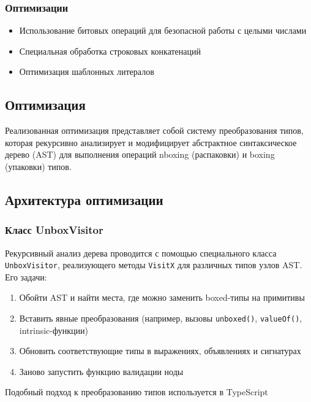 \subsubsection*{Оптимизации}
\begin{itemize}[label={--}]
    \item Использование битовых операций для безопасной работы с целыми числами
    \item Специальная обработка строковых конкатенаций
    \item Оптимизация шаблонных литералов
\end{itemize}

\subsection{Оптимизация}


Реализованная оптимизация представляет собой систему преобразования типов, которая рекурсивно анализирует и модифицирует абстрактное синтаксическое дерево (AST) для выполнения операций nboxing (распаковки) и boxing (упаковки) типов.

\subsection*{Архитектура оптимизации}

\subsubsection{Класс UnboxVisitor}
Рекурсивный анализ дерева проводится с помощью специального класса \texttt{UnboxVisitor}, реализующего методы \texttt{VisitX} для различных типов узлов AST. Его задачи:
\begin{enumerate}
    \item Обойти AST и найти места, где можно заменить boxed-типы на примитивы
    \item Вставить явные преобразования (например, вызовы \texttt{unboxed()}, \texttt{valueOf()}, intrinsic-функции)
    \item Обновить соответствующие типы в выражениях, объявлениях и сигнатурах
    \item Заново запустить функцию валидации ноды
\end{enumerate}

Подобный подход к преобразованию типов используется в TypeScript \cite{typescript_doc}
